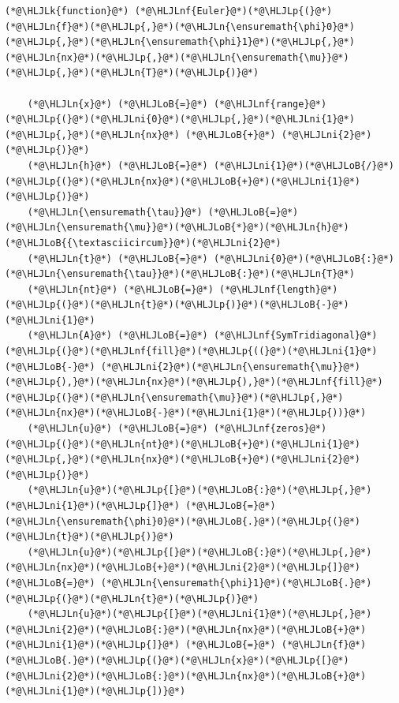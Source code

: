 \documentclass[12pt,a4paper]{article}
\newcommand{\HLJLk}[1]{\textcolor[RGB]{148,91,176}{\textbf{#1}}}
\newcommand{\HLJLn}[1]{#1}
\newcommand{\HLJLnf}[1]{\textcolor[RGB]{66,102,213}{#1}}
\newcommand{\HLJLni}[1]{\textcolor[RGB]{59,151,46}{#1}}
\newcommand{\HLJLoB}[1]{\textcolor[RGB]{102,102,102}{\textbf{#1}}}
\newcommand{\HLJLp}[1]{#1}
\begin{document}
\begin{lstlisting}
(*@\HLJLk{function}@*) (*@\HLJLnf{Euler}@*)(*@\HLJLp{(}@*)(*@\HLJLn{f}@*)(*@\HLJLp{,}@*)(*@\HLJLn{\ensuremath{\phi}0}@*)(*@\HLJLp{,}@*)(*@\HLJLn{\ensuremath{\phi}1}@*)(*@\HLJLp{,}@*)(*@\HLJLn{nx}@*)(*@\HLJLp{,}@*)(*@\HLJLn{\ensuremath{\mu}}@*)(*@\HLJLp{,}@*)(*@\HLJLn{T}@*)(*@\HLJLp{)}@*)
    
    (*@\HLJLn{x}@*) (*@\HLJLoB{=}@*) (*@\HLJLnf{range}@*)(*@\HLJLp{(}@*)(*@\HLJLni{0}@*)(*@\HLJLp{,}@*)(*@\HLJLni{1}@*)(*@\HLJLp{,}@*)(*@\HLJLn{nx}@*) (*@\HLJLoB{+}@*) (*@\HLJLni{2}@*)(*@\HLJLp{)}@*)
    (*@\HLJLn{h}@*) (*@\HLJLoB{=}@*) (*@\HLJLni{1}@*)(*@\HLJLoB{/}@*)(*@\HLJLp{(}@*)(*@\HLJLn{nx}@*)(*@\HLJLoB{+}@*)(*@\HLJLni{1}@*)(*@\HLJLp{)}@*)
    (*@\HLJLn{\ensuremath{\tau}}@*) (*@\HLJLoB{=}@*) (*@\HLJLn{\ensuremath{\mu}}@*)(*@\HLJLoB{*}@*)(*@\HLJLn{h}@*)(*@\HLJLoB{{\textasciicircum}}@*)(*@\HLJLni{2}@*)
    (*@\HLJLn{t}@*) (*@\HLJLoB{=}@*) (*@\HLJLni{0}@*)(*@\HLJLoB{:}@*)(*@\HLJLn{\ensuremath{\tau}}@*)(*@\HLJLoB{:}@*)(*@\HLJLn{T}@*)
    (*@\HLJLn{nt}@*) (*@\HLJLoB{=}@*) (*@\HLJLnf{length}@*)(*@\HLJLp{(}@*)(*@\HLJLn{t}@*)(*@\HLJLp{)}@*)(*@\HLJLoB{-}@*)(*@\HLJLni{1}@*)
    (*@\HLJLn{A}@*) (*@\HLJLoB{=}@*) (*@\HLJLnf{SymTridiagonal}@*)(*@\HLJLp{(}@*)(*@\HLJLnf{fill}@*)(*@\HLJLp{((}@*)(*@\HLJLni{1}@*) (*@\HLJLoB{-}@*) (*@\HLJLni{2}@*)(*@\HLJLn{\ensuremath{\mu}}@*)(*@\HLJLp{),}@*)(*@\HLJLn{nx}@*)(*@\HLJLp{),}@*)(*@\HLJLnf{fill}@*)(*@\HLJLp{(}@*)(*@\HLJLn{\ensuremath{\mu}}@*)(*@\HLJLp{,}@*)(*@\HLJLn{nx}@*)(*@\HLJLoB{-}@*)(*@\HLJLni{1}@*)(*@\HLJLp{))}@*)
    (*@\HLJLn{u}@*) (*@\HLJLoB{=}@*) (*@\HLJLnf{zeros}@*)(*@\HLJLp{(}@*)(*@\HLJLn{nt}@*)(*@\HLJLoB{+}@*)(*@\HLJLni{1}@*)(*@\HLJLp{,}@*)(*@\HLJLn{nx}@*)(*@\HLJLoB{+}@*)(*@\HLJLni{2}@*)(*@\HLJLp{)}@*)
    (*@\HLJLn{u}@*)(*@\HLJLp{[}@*)(*@\HLJLoB{:}@*)(*@\HLJLp{,}@*)(*@\HLJLni{1}@*)(*@\HLJLp{]}@*) (*@\HLJLoB{=}@*) (*@\HLJLn{\ensuremath{\phi}0}@*)(*@\HLJLoB{.}@*)(*@\HLJLp{(}@*)(*@\HLJLn{t}@*)(*@\HLJLp{)}@*)
    (*@\HLJLn{u}@*)(*@\HLJLp{[}@*)(*@\HLJLoB{:}@*)(*@\HLJLp{,}@*)(*@\HLJLn{nx}@*)(*@\HLJLoB{+}@*)(*@\HLJLni{2}@*)(*@\HLJLp{]}@*) (*@\HLJLoB{=}@*) (*@\HLJLn{\ensuremath{\phi}1}@*)(*@\HLJLoB{.}@*)(*@\HLJLp{(}@*)(*@\HLJLn{t}@*)(*@\HLJLp{)}@*)
    (*@\HLJLn{u}@*)(*@\HLJLp{[}@*)(*@\HLJLni{1}@*)(*@\HLJLp{,}@*)(*@\HLJLni{2}@*)(*@\HLJLoB{:}@*)(*@\HLJLn{nx}@*)(*@\HLJLoB{+}@*)(*@\HLJLni{1}@*)(*@\HLJLp{]}@*) (*@\HLJLoB{=}@*) (*@\HLJLn{f}@*)(*@\HLJLoB{.}@*)(*@\HLJLp{(}@*)(*@\HLJLn{x}@*)(*@\HLJLp{[}@*)(*@\HLJLni{2}@*)(*@\HLJLoB{:}@*)(*@\HLJLn{nx}@*)(*@\HLJLoB{+}@*)(*@\HLJLni{1}@*)(*@\HLJLp{])}@*)


\end{lstlisting}
\end{document}
